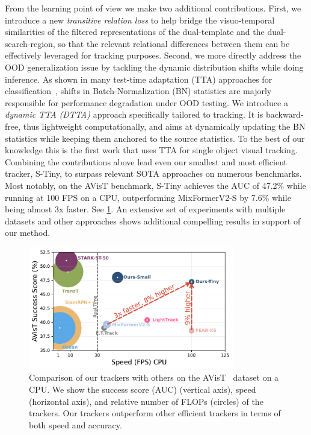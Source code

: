 From the learning point of view we make two additional contributions. First, we introduce a new \emph{transitive relation loss} to help bridge the visuo-temporal similarities of the filtered representations of the dual-template and the dual-search-region, so that the relevant relational differences between them can be effectively leveraged for tracking purposes. Second, we more directly address the OOD generalization issue by tackling the dynamic distribution shifts while doing inference. As shown in many test-time adaptation (TTA) approaches for classification~\cite{wang2020tent,mirza2022norm, pan2018two, niu2022efficient, schneider2020improving, li2016revisiting}, shifts in Batch-Normalization (BN) statistics are majorly responsible for performance degradation under OOD testing. We introduce a \emph{dynamic TTA (DTTA)} approach specifically tailored to tracking. It is backward-free, thus lightweight computationally, and aims at dynamically updating the BN statistics while keeping them anchored to the source statistics. To the best of our knowledge this is the first work that uses TTA for single object visual tracking.\\


Combining the contributions above lead even our smallest and most efficient tracker, S-Tiny, to surpass relevant SOTA approaches on numerous benchmarks. Most notably, on the AVisT benchmark, S-Tiny achieves the AUC of 47.2\% while running at 100 FPS on a CPU, outperforming MixFormerV2-S by 7.6\% while being almost 3x faster. See \ref{fig:avist_comparision_fig}. An extensive set of experiments with multiple datasets and other approaches shows additional compelling results in support of our method.

\begin{figure}
    \centering
        \includegraphics[width=0.8\textwidth]{figures/avist_comparison_fig_new.pdf}
    \caption{Comparison of our trackers with others on the AVisT~\cite{noman2022avist} dataset on a CPU. We show the success score (AUC) (vertical axis), speed (horizontal axis), and relative number of FLOPs (circles) of the trackers. Our trackers outperform other efficient trackers in terms of both speed and accuracy.}
    \label{fig:avist_comparision_fig}
\end{figure}